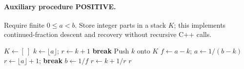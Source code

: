 \documentclass[11pt]{article}
\theoremstyle{definition}
\begin{document}
\begin{samepage}
\paragraph{Auxiliary procedure POSITIVE.}
Require finite $0\le a<b$. Store integer parts in a stack $K$; this implements
continued-fraction descent and recovery without recursive C++ calls.
\begin{algorithmic}[1]
\State $K\gets[\ ]$
\Loop
 \State $k\gets\lfloor a\rfloor$; $r\gets k+1$
  \State \textbf{break} \EndIf
 \State Push $k$ onto $K$
 \State $f\gets a-k$; $a\gets1/(b-k)$
  \State $r\gets\lfloor a\rfloor+1$; \textbf{break}
 \EndIf
 \State $b\gets1/f$
\EndLoop
{} \State $r\gets k+1/r$ \EndFor
\State \Return $r$
\end{algorithmic}
\end{samepage}
\end{document}
